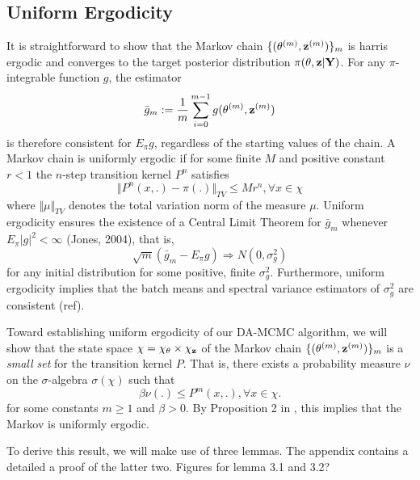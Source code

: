 \documentclass[11pt]{article}
\begin{document}
	\subsection{Uniform Ergodicity}
	
	It is straightforward to show that the Markov chain $\{(\theta^{(m)}, \mathbf{z}^{(m)})\}_m$ is harris ergodic and converges to the target posterior distribution $\pi(\theta, \mathbf{z}|\mathbf{Y})$. For any $\pi$-integrable function $g$, the estimator
	$$\bar{g}_m := \frac{1}{m} \sum_{i=0}^{m-1} g(\theta^{(m)}, \mathbf{z}^{(m)})$$
	is therefore consistent for $E_\pi g$, regardless of the starting values of the chain. A Markov chain is uniformly ergodic if for some finite $M$ and positive constant $r<1$ the $n$-step transition kernel $P^n$ satisfies
	$$
	\Vert P^n(x,.)-\pi(.)\Vert_{TV} \le M r^n, \forall x \in \chi
	$$
	where $\Vert \mu \Vert_{TV}$ denotes the total variation norm of the measure $\mu$.
	Uniform ergodicity ensures the existence of a Central Limit Theorem for $\bar{g}_m$ whenever $E_\pi |g|^2 < \infty$ (Jones, 2004), that is,
	$$\sqrt{m}(\bar{g}_m - E_\pi g) \Rightarrow N(0, \sigma^2_g)$$
	for any initial distribution for some positive, finite $\sigma^2_g$. Furthermore, uniform ergodicity implies that the batch means and spectral variance estimators of $\sigma^2_g$ are consistent (ref).
	
	
	
	Toward establishing uniform ergodicity of our DA-MCMC algorithm, we will show that the state space $\chi = \chi_{\theta}\times\chi_{\mathbf{z}}$ of the Markov chain $\{(\theta^{(m)}, \mathbf{z}^{(m)})\}_m$ is a \textit{small set} for the transition kernel $P$. That is, there exists a probability measure $\nu$ on the $\sigma$-algebra $\sigma(\chi)$ such that
	$$\beta \nu(.) \le P^m(x,.), \forall x\in \chi.$$
	for some constants $m \ge 1$ and $\beta > 0$.
	By Proposition 2 in \cite{Tierney.1994}, this implies that the Markov is uniformly ergodic. 
	
	To derive this result, we will make use of three lemmas. The appendix contains a detailed a proof of the latter two.
	\rm{Figures for lemma 3.1 and 3.2?}
	
\end{document}
